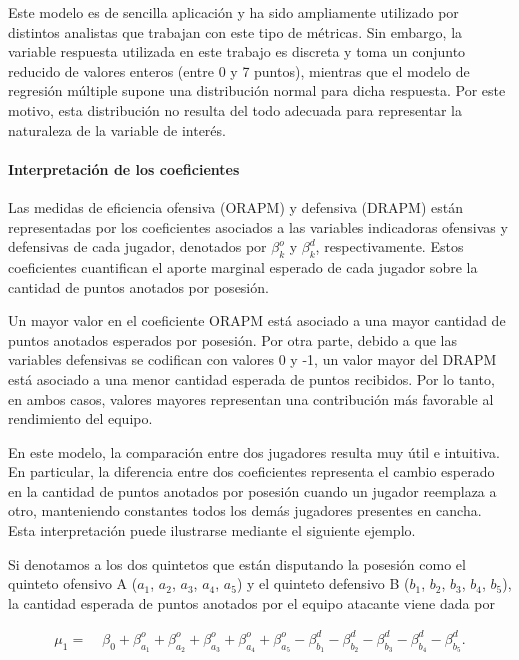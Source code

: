 \documentclass[
  12pt,
]{article}
\begin{document}
Este modelo es de sencilla aplicación y ha sido ampliamente utilizado
por distintos analistas que trabajan con este tipo de métricas. Sin
embargo, la variable respuesta utilizada en este trabajo es discreta y
toma un conjunto reducido de valores enteros (entre 0 y 7 puntos),
mientras que el modelo de regresión múltiple supone una distribución
normal para dicha respuesta. Por este motivo, esta distribución no
resulta del todo adecuada para representar la naturaleza de la variable
de interés.

\paragraph{Interpretación de los
coeficientes}\label{interpretaciuxf3n-de-los-coeficientes}

Las medidas de eficiencia ofensiva (ORAPM) y defensiva (DRAPM) están
representadas por los coeficientes asociados a las variables indicadoras
ofensivas y defensivas de cada jugador, denotados por \(\beta_k^o\) y
\(\beta_k^d\), respectivamente. Estos coeficientes cuantifican el aporte
marginal esperado de cada jugador sobre la cantidad de puntos anotados
por posesión.

Un mayor valor en el coeficiente ORAPM está asociado a una mayor
cantidad de puntos anotados esperados por posesión. Por otra parte,
debido a que las variables defensivas se codifican con valores 0 y -1,
un valor mayor del DRAPM está asociado a una menor cantidad esperada de
puntos recibidos. Por lo tanto, en ambos casos, valores mayores
representan una contribución más favorable al rendimiento del equipo.

En este modelo, la comparación entre dos jugadores resulta muy útil e
intuitiva. En particular, la diferencia entre dos coeficientes
representa el cambio esperado en la cantidad de puntos anotados por
posesión cuando un jugador reemplaza a otro, manteniendo constantes
todos los demás jugadores presentes en cancha. Esta interpretación puede
ilustrarse mediante el siguiente ejemplo.

Si denotamos a los dos quintetos que están disputando la posesión como
el quinteto ofensivo A (\(a_1\), \(a_2\), \(a_3\), \(a_4\), \(a_5\)) y
el quinteto defensivo B (\(b_1\), \(b_2\), \(b_3\), \(b_4\), \(b_5\)),
la cantidad esperada de puntos anotados por el equipo atacante viene
dada por

\[
\begin{aligned}
\mu_1 =\;&
\beta_0
+\beta_{a_1}^{o}
+\beta_{a_2}^{o}
+\beta_{a_3}^{o}
+\beta_{a_4}^{o}
+\beta_{a_5}^{o}
-\beta_{b_1}^{d}
-\beta_{b_2}^{d}
-\beta_{b_3}^{d}
-\beta_{b_4}^{d}
-\beta_{b_5}^{d}.
\end{aligned}
\]
\end{document}
